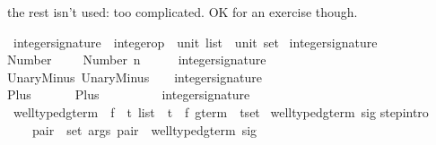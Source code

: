 \begin{isabellebody}
%
\begin{isamarkuptext}%
the rest isn't used: too complicated.  OK for an exercise though.%
\end{isamarkuptext}%
\ integer{\isacharunderscore}signature\ {\isacharcolon}{\isacharcolon}\ {\isachardoublequote}{\isacharparenleft}integer{\isacharunderscore}op\ {\isacharasterisk}\ {\isacharparenleft}unit\ list\ {\isacharasterisk}\ unit{\isacharparenright}{\isacharparenright}\ set{\isachardoublequote}\isanewline
{}\ {\isachardoublequote}integer{\isacharunderscore}signature{\isachardoublequote}\isanewline
{}\isanewline
Number{\isacharcolon}\ \ \ \ \ {\isachardoublequote}{\isacharparenleft}Number\ n{\isacharcomma}\ \ \ {\isacharparenleft}{\isacharbrackleft}{\isacharbrackright}{\isacharcomma}\ {\isacharparenleft}{\isacharparenright}{\isacharparenright}{\isacharparenright}\ {\isasymin}\ integer{\isacharunderscore}signature{\isachardoublequote}\isanewline
UnaryMinus{\isacharcolon}\ {\isachardoublequote}{\isacharparenleft}UnaryMinus{\isacharcomma}\ {\isacharparenleft}{\isacharbrackleft}{\isacharparenleft}{\isacharparenright}{\isacharbrackright}{\isacharcomma}\ {\isacharparenleft}{\isacharparenright}{\isacharparenright}{\isacharparenright}\ {\isasymin}\ integer{\isacharunderscore}signature{\isachardoublequote}\isanewline
Plus{\isacharcolon}\ \ \ \ \ \ \ {\isachardoublequote}{\isacharparenleft}Plus{\isacharcomma}\ \ \ \ \ \ \ {\isacharparenleft}{\isacharbrackleft}{\isacharparenleft}{\isacharparenright}{\isacharcomma}{\isacharparenleft}{\isacharparenright}{\isacharbrackright}{\isacharcomma}\ {\isacharparenleft}{\isacharparenright}{\isacharparenright}{\isacharparenright}\ {\isasymin}\ integer{\isacharunderscore}signature{\isachardoublequote}\isanewline
\isanewline
\isanewline
{}\ well{\isacharunderscore}typed{\isacharunderscore}gterm\ {\isacharcolon}{\isacharcolon}\ {\isachardoublequote}{\isacharparenleft}{\isacharprime}f\ {\isasymRightarrow}\ {\isacharprime}t\ list\ {\isacharasterisk}\ {\isacharprime}t{\isacharparenright}\ {\isasymRightarrow}\ {\isacharparenleft}{\isacharprime}f\ gterm\ {\isacharasterisk}\ {\isacharprime}t{\isacharparenright}set{\isachardoublequote}\isanewline
{}\ {\isachardoublequote}well{\isacharunderscore}typed{\isacharunderscore}gterm\ sig{\isachardoublequote}\isanewline
{}\isanewline
step{\isacharbrackleft}intro{\isacharbang}{\isacharbrackright}{\isacharcolon}\ \isanewline
\ \ \ \ {\isachardoublequote}{\isasymlbrakk}{\isasymforall}pair\ {\isasymin}\ set\ args{\isachardot}\ pair\ {\isasymin}\ well{\isacharunderscore}typed{\isacharunderscore}gterm\ sig{\isacharsemicolon}\ \isanewline

\end{isabellebody}
